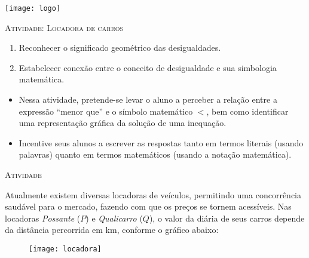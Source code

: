 \documentclass[10 pt,usenames,dvipsnames, oneside]{article}
\begin{document}
\begin{center}
  \begin{minipage}[l]{3cm}
\texttt{[image: logo]}    
\end{minipage}\hfill
\begin{minipage}[r]{.8\textwidth}
 {\Large \scshape Atividade: Locadora de carros}  
\end{minipage}
\end{center}
\vspace{.2cm}

\ifdefined\prof

\begin{goals}
\begin{enumerate}
\item Reconhecer o significado geométrico das desigualdades.
 \item Estabelecer conexão entre o conceito de desigualdade e sua simbologia matemática.
\end{enumerate}

\tcblower

\begin{itemize}
\item Nessa atividade, pretende-se levar o aluno a perceber a relação entre a expressão “menor que” e o símbolo matemático $<$, bem como identificar uma representação gráfica da solução de uma inequação.
\item Incentive seus alunos a escrever as respostas tanto em termos literais (usando palavras) quanto em termos matemáticos (usando a notação matemática).
\end{itemize}
\end{goals}

\bigskip
\begin{center}
{\large \scshape Atividade}
\end{center}
\fi

Atualmente existem diversas locadoras de veículos, permitindo uma concorrência saudável para o mercado, fazendo com que os preços se tornem acessíveis. Nas locadoras \emph{Possante} ($P$) e \emph{Qualicarro} ($Q$), o valor da diária de seus carros depende da distância percorrida em km, conforme o gráfico abaixo:

\begin{figure}[H]
\centering
\noindent\texttt{[image: locadora]}
\end{figure}
\end{document}
